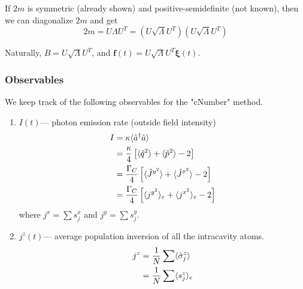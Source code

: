 \documentclass{article}
\newcommand{\gc}{\Gamma_C}
\begin{document}
If $2m$ is symmetric (already shown) and positive-semidefinite (not known), then we can diagonalize $2m$ and get
\begin{equation}
    2m = U\Lambda U^T = (U\sqrt{\Lambda}U^T)(U\sqrt{\Lambda}U^T)
\end{equation}

Naturally, $B= U\sqrt{\Lambda}U^T$, and $\boldsymbol{f}(t)=U\sqrt{\Lambda}U^T\boldsymbol{\xi}(t)$.


\subsubsection{Observables}
We keep track of the following observables for the "cNumber" method. 
\begin{enumerate}
    \item  $I(t)$\---- photon emission rate (outside field intensity)
        \begin{align}
            \notag I &= \kappa \langle \hat{a}^\dagger \hat{a} \rangle\\
            \notag   &= \frac{\kappa}{4}\left[\langle \hat{q}^2\rangle+\langle\hat{p}^2\rangle-2\right]\\
            \notag   &= \frac{\gc}{4} \left[\langle \hat{J}^{y^2}\rangle+\langle\hat{J}^{x^2}\rangle-2\right]\\
                     &= \frac{\gc}{4}\left[\langle j^{y^2} \rangle_e+\langle j^{x^2} \rangle_e-2\right]
        \end{align}
        where $j^x=\sum s^x_j$ and $j^y=\sum s^y_j$.
    \item $j^z(t)$\---- average population inversion of all the intracavity atoms.
        \begin{align}
            \notag j^z &= \frac{1}{N}\sum \langle \hat{\sigma}^z _j\rangle\\
                       &= \frac{1}{N}\sum \langle s_j^z\rangle_e
        \end{align}
        

\end{enumerate}
\end{document}
